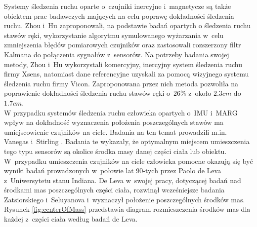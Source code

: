 Systemy śledzenia ruchu oparte o~czujniki inercyjne i~magnetycze są także obiektem prac badawczych mających na celu poprawę dokładności śledzenia ruchu. Zhou i~Hu \cite{Zhou2005,Zhou2006} zaproponowali, na podstawie badań opartych o śledzenia ruchu stawów ręki, wykorzystanie algorytmu symulowanego wyżarzania w~celu zmniejszenia błędów pomiarowych czujników oraz zastosowali rozszerzony filtr Kalmana do połączenia sygnałów z~sensorów. Na potrzeby badania swojej metody, Zhou i~Hu wykorzystali komercyjny, inercyjny system śledzenia ruchu firmy Xsens, natomiast dane referencyjne uzyskali za pomocą wizyjnego systemu śledzenia ruchu firmy Vicon. Zaproponowana przez nich metoda pozwoliła na poprawienie dokładności śledzenia ruchu stawów ręki o~$26\%$ z~około $2.3 cm$ do $1.7 cm$.\\
							
W przypadku systemów śledzenia ruchu człowieka opartych o~IMU i~MARG wpływ na dokładność wyznaczenia położenia poszczególnych stawów ma umiejscowienie czujników na ciele. Badania na ten temat prowadzili m.in. Vanegas i~Stirling \cite{Vanegas2015}. Badania te wykazały, że optymalnym miejscem umieszczenia tego typu sensorów są okolice środka masy danej części ciała lub obiektu. W~przypadku umieszczenia czujników na ciele człowieka pomocne okazują się być wyniki badań prowadzonych w~połowie lat 90-tych przez Paolo de Leva z~Uniwersytetu stanu Indiana. De Leva w~swojej pracy, dotyczącej badań nad środkami mas poszczególnych części ciała\cite{DeLeva1996}, rozwinął wcześniejsze badania Zatsiorskiego i~Seluyanova \cite{549} i~wyznaczył położenie poszczególnych środków mas. Rysunek \ref{fig:centerOfMass} przedstawia diagram rozmieszczenia środków mas dla każdej z~części ciała według badań de Leva.
							
